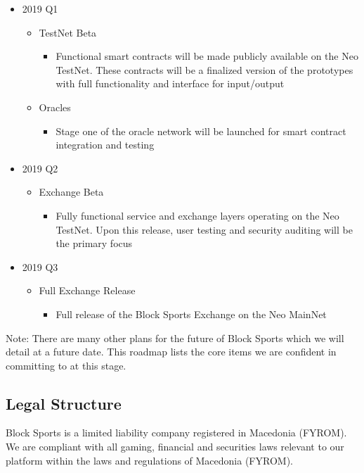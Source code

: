 \documentclass{article}
\begin{document}
\begin{itemize}
   \item 2019 Q1
   \begin{itemize}
     \item TestNet Beta
     	\begin{itemize}
     		\item Functional smart contracts will be made publicly available on the Neo TestNet. These contracts will be a finalized version of the prototypes with full functionality and interface for input/output
     	\end{itemize}
     \item Oracles
     	\begin{itemize}
     		\item Stage one of the oracle network will be launched for smart contract integration and testing
     	\end{itemize}
   \end{itemize}
	\newpage
    \item 2019 Q2
   \begin{itemize}
     \item Exchange Beta
     	\begin{itemize}
     		\item Fully functional service and exchange layers operating on the Neo TestNet. Upon this release, user testing and security auditing will be the primary focus
     	\end{itemize}
   \end{itemize}

   \item 2019 Q3
   \begin{itemize}
     \item Full Exchange Release
     	\begin{itemize}
     		\item Full release of the Block Sports Exchange on the Neo MainNet
     	\end{itemize}
   \end{itemize}

\end{itemize}

Note: There are many other plans for the future of Block Sports which we will detail at a future date. This roadmap lists the core items we are confident in committing to at this stage.

	\subsection{Legal Structure} \label{legal-structure}
Block Sports is a limited liability company registered in Macedonia (FYROM). We are compliant with all gaming, financial and securities laws relevant to our platform within the laws and regulations of Macedonia (FYROM).
\end{document}
